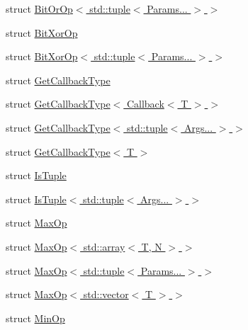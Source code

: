 \begin{DoxyCompactItemize}
\item 
struct \hyperlink{structvt_1_1collective_1_1reduce_1_1operators_1_1_bit_or_op_3_01std_1_1tuple_3_01_params_8_8_8_01_4_01_4}{Bit\+Or\+Op$<$ std\+::tuple$<$ Params... $>$ $>$}
\item 
struct \hyperlink{structvt_1_1collective_1_1reduce_1_1operators_1_1_bit_xor_op}{Bit\+Xor\+Op}
\item 
struct \hyperlink{structvt_1_1collective_1_1reduce_1_1operators_1_1_bit_xor_op_3_01std_1_1tuple_3_01_params_8_8_8_01_4_01_4}{Bit\+Xor\+Op$<$ std\+::tuple$<$ Params... $>$ $>$}
\item 
struct \hyperlink{structvt_1_1collective_1_1reduce_1_1operators_1_1_get_callback_type}{Get\+Callback\+Type}
\item 
struct \hyperlink{structvt_1_1collective_1_1reduce_1_1operators_1_1_get_callback_type_3_01_callback_3_01_t_01_4_01_4}{Get\+Callback\+Type$<$ Callback$<$ T $>$ $>$}
\item 
struct \hyperlink{structvt_1_1collective_1_1reduce_1_1operators_1_1_get_callback_type_3_01std_1_1tuple_3_01_args_8_8_8_01_4_01_4}{Get\+Callback\+Type$<$ std\+::tuple$<$ Args... $>$ $>$}
\item 
struct \hyperlink{structvt_1_1collective_1_1reduce_1_1operators_1_1_get_callback_type_3_01_t_01_4}{Get\+Callback\+Type$<$ T $>$}
\item 
struct \hyperlink{structvt_1_1collective_1_1reduce_1_1operators_1_1_is_tuple}{Is\+Tuple}
\item 
struct \hyperlink{structvt_1_1collective_1_1reduce_1_1operators_1_1_is_tuple_3_01std_1_1tuple_3_01_args_8_8_8_01_4_01_4}{Is\+Tuple$<$ std\+::tuple$<$ Args... $>$ $>$}
\item 
struct \hyperlink{structvt_1_1collective_1_1reduce_1_1operators_1_1_max_op}{Max\+Op}
\item 
struct \hyperlink{structvt_1_1collective_1_1reduce_1_1operators_1_1_max_op_3_01std_1_1array_3_01_t_00_01_n_01_4_01_4}{Max\+Op$<$ std\+::array$<$ T, N $>$ $>$}
\item 
struct \hyperlink{structvt_1_1collective_1_1reduce_1_1operators_1_1_max_op_3_01std_1_1tuple_3_01_params_8_8_8_01_4_01_4}{Max\+Op$<$ std\+::tuple$<$ Params... $>$ $>$}
\item 
struct \hyperlink{structvt_1_1collective_1_1reduce_1_1operators_1_1_max_op_3_01std_1_1vector_3_01_t_01_4_01_4}{Max\+Op$<$ std\+::vector$<$ T $>$ $>$}
\item 
struct \hyperlink{structvt_1_1collective_1_1reduce_1_1operators_1_1_min_op}{Min\+Op}
\item 

\end{DoxyCompactItemize}

